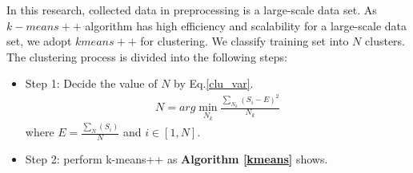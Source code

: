 In this research, collected data in preprocessing is a large-scale data set. As $k-means++$ algorithm has high efficiency and scalability for a large-scale data set, we adopt $kmeans++$ for clustering. We classify training set into $N$ clusters. The clustering process is divided into the following steps:
\begin{itemize}
	\item Step 1: Decide the value of $N$ by Eq.\ref{clu_var}.
	\begin{eqnarray}\label{clu_var}
		N=arg\min \limits_{N_{k}}{\frac{\sum _{N_{k}}(S_{i}-E)^{2}}{N_{k}}}
	\end{eqnarray}
	where $E = \frac{\sum _{N}(S_{i})}{N}$ and $i\in [1,N]$.
	\item Step 2: perform k-means++ as \textbf{Algorithm \ref{kmeans}} shows.

\end{itemize}
